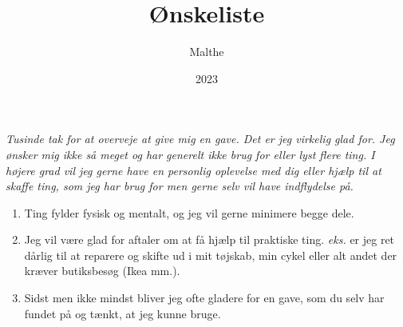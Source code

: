 \documentclass[12pt]{article}
\title{Ønskeliste}
\author{Malthe}
\date{2023}
\begin{document}
\maketitle

\begin{center}
\textit{
Tusinde tak for at overveje at give mig en gave. Det er jeg virkelig glad for. Jeg ønsker mig ikke så meget og har generelt ikke brug for eller lyst flere ting. I højere grad vil jeg gerne have en personlig oplevelse med dig eller hjælp til at skaffe ting, som jeg har brug for men gerne selv vil have indflydelse på.
}
\end{center}

\begin{enumerate}
	\item[\emoji{face-with-monocle}] Ting fylder fysisk og mentalt, og jeg vil gerne minimere begge dele.
	\item[\emoji{sweat-smile}] Jeg vil være glad for aftaler om at få hjælp til praktiske ting. \textit{eks.} er jeg ret dårlig til at reparere og skifte ud i mit tøjskab, min cykel eller alt andet der kræver butiksbesøg (Ikea mm.). 
	\item[\emoji{heart}] Sidst men ikke mindst bliver jeg ofte gladere for en gave, som du selv har fundet på og tænkt, at jeg kunne bruge.
\end{enumerate}
\end{document}
